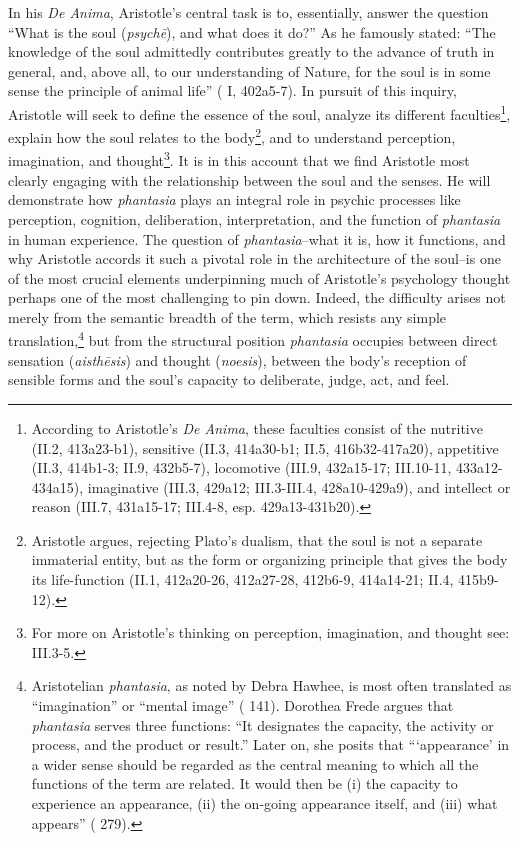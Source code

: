 \documentclass{article}
\begin{document}
In his \textit{De Anima}, Aristotle's central task is to, essentially, answer the question ``What is the soul (\textit{psychē}), and what does it do?'' As he famously stated: ``The knowledge of the soul admittedly contributes greatly to the advance of truth in general, and, above all, to our understanding of Nature, for the soul is in some sense the principle of animal life'' ( I, 402a5-7). In pursuit of this inquiry, Aristotle will seek to define the essence of the soul, analyze its different faculties\footnote{According to Aristotle's \textit{De Anima}, these faculties consist of the nutritive (II.2, 413a23-b1), sensitive (II.3, 414a30-b1; II.5, 416b32-417a20), appetitive (II.3, 414b1-3; II.9, 432b5-7), locomotive (III.9, 432a15-17; III.10-11, 433a12-434a15), imaginative (III.3, 429a12; III.3-III.4, 428a10-429a9), and intellect or reason (III.7, 431a15-17; III.4-8, esp. 429a13-431b20).}, explain how the soul relates to the body\footnote{Aristotle argues, rejecting Plato's dualism, that the soul is not a separate immaterial entity, but as the form or organizing principle that gives the body its life-function (II.1, 412a20-26, 412a27-28, 412b6-9, 414a14-21; II.4, 415b9-12).}, and to understand perception, imagination, and thought\footnote{For more on Aristotle's thinking on perception, imagination, and thought see: III.3-5.}. It is in this account that we find Aristotle most clearly engaging with the relationship between the soul and the senses. He will demonstrate how \textit{phantasia} plays an integral role in psychic processes like perception, cognition, deliberation, interpretation, and the function of \textit{phantasia} in human experience. The question of \textit{phantasia}--what it is, how it functions, and why Aristotle accords it such a pivotal role in the architecture of the soul--is one of the most crucial elements underpinning much of Aristotle's psychology thought perhaps one of the most challenging to pin down. Indeed, the difficulty arises not merely from the semantic breadth of the term, which resists any simple translation,\footnote{Aristotelian \textit{phantasia}, as noted by Debra Hawhee, is most often translated as ``imagination'' or ``mental image'' (\cite{hawhee_aristotles_eyes} 141). Dorothea Frede argues that \textit{phantasia} serves three functions: ``It designates the capacity, the activity or process, and the product or result.'' Later on, she posits that ```appearance' in a wider sense should be regarded as the central meaning to which all the functions of the term are related. It would then be (i) the capacity to experience an appearance, (ii) the on-going appearance itself, and (iii) what appears'' (\cite{frede1992cognitive} 279).} but from the structural position \textit{phantasia} occupies between direct sensation (\textit{aisthēsis}) and thought (\textit{noesis}), between the body's reception of sensible forms and the soul's capacity to deliberate, judge, act, and feel. 
\end{document}
